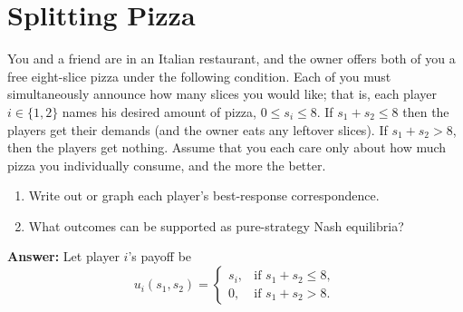 \documentclass[12pt,a4paper]{article}
\begin{document}
\maketitle

\section{Splitting Pizza}
You and a friend are in an Italian restaurant, and the owner offers both of you a free eight-slice pizza under the following condition. Each of you must simultaneously announce how many slices you would like; that is, each player $i \in \{1, 2\}$ names his desired amount of pizza, $0 \le s_i \le 8$. If $s_1 + s_2 \le 8$ then the players get their demands (and the owner eats any leftover slices). If $s_1 + s_2 > 8$, then the players get nothing. Assume that you each care only about how much pizza you individually consume, and the more the better.

\begin{enumerate}[label=(\alph*)]
  \item Write out or graph each player’s best-response correspondence.
  \item What outcomes can be supported as pure-strategy Nash equilibria?
\end{enumerate}

\vspace{0.5cm}

\noindent\textbf{Answer:} Let player \(i\)'s payoff be
\[
u_i(s_1,s_2)=
\begin{cases}
s_i, & \text{if } s_1+s_2\le 8,\\
0, & \text{if } s_1+s_2>8.
\end{cases}
\]
\end{document}
